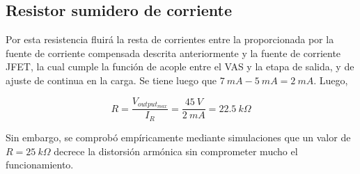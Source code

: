 \subsection{Resistor sumidero de corriente}

Por esta resistencia fluirá la resta de corrientes entre la proporcionada por la fuente de corriente compensada descrita anteriormente y la fuente de corriente JFET, la cual cumple la función de acople entre el VAS y la etapa de salida, y de ajuste de continua en la carga. Se tiene luego que $7 \ mA - 5 \ mA = 2 \ mA$. Luego,

\begin{equation}
R = \frac{V_{output_{max}}}{I_R} = \frac{45 \ V}{2 \ mA} = 22.5 \ k\Omega 
\end{equation} 

Sin embargo, se comprobó empíricamente mediante simulaciones que un valor de $R = 25 \ k\Omega$ decrece la distorsión armónica sin comprometer mucho el funcionamiento.
